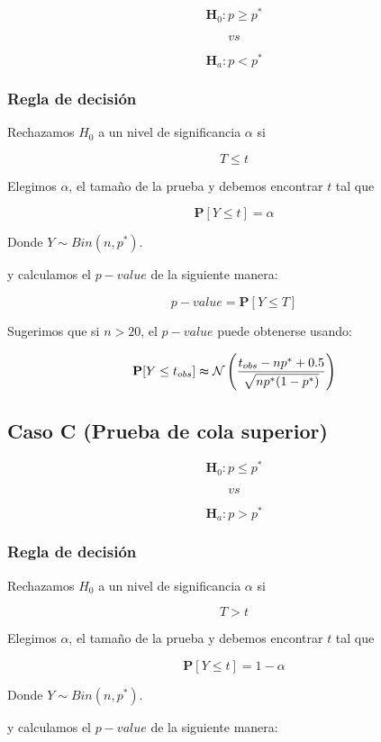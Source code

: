 \documentclass[
  a4paper,
  oneside,
  openany]{book}
\begin{document}
\[\textbf{H}_0: p  \geq p^*\]

\[vs\]

\[\textbf{H}_a: p <p^*\]

\hypertarget{regla-de-decisiuxf3n-1}{%
\subsubsection*{Regla de decisión}\label{regla-de-decisiuxf3n-1}}


Rechazamos \(H_0\) a un nivel de significancia \(\alpha\) si

\[T \leq t\]

Elegimos \(\alpha\), el tamaño de la prueba y debemos encontrar \(t\) tal que

\[\mathbf{P}[Y \leq t]=\alpha\]

Donde \(Y \sim Bin (n,p^*)\).

y calculamos el \(p-value\) de la siguiente manera:

\[p-value= \mathbf{P}[Y\leq T]\]

Sugerimos que si \(n > 20\), el \(p-value\) puede obtenerse usando:

\[\mathbf{P}[Y\leq t_{obs}] \thickapprox \mathcal{N} \left(\frac{t_{obs}-np^*+0.5}{\sqrt{np^*(1-p^*)}}\right)\]

\hypertarget{caso-c-prueba-de-cola-superior}{%
\subsection*{Caso C (Prueba de cola superior)}\label{caso-c-prueba-de-cola-superior}}


\[\textbf{H}_{0}: p  \leq p^*\]

\[vs\]

\[\textbf{H}_{a}: p >p^*\]

\hypertarget{regla-de-decisiuxf3n-2}{%
\subsubsection*{Regla de decisión}\label{regla-de-decisiuxf3n-2}}


Rechazamos \(H_0\) a un nivel de significancia \(\alpha\) si

\[T > t\]

Elegimos \(\alpha\), el tamaño de la prueba y debemos encontrar \(t\) tal que

\[\mathbf{P}[Y \leq t]=1-\alpha\]

Donde \(Y \sim Bin (n,p^*)\).

y calculamos el \(p-value\) de la siguiente manera:
\end{document}
